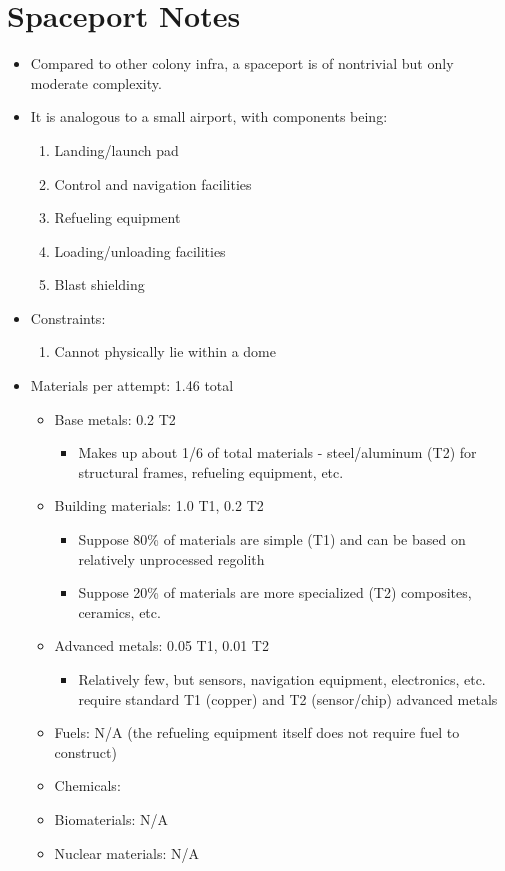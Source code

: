 \documentclass{article}
\begin{document}
\section*{Spaceport Notes}
\begin{itemize}
    \item Compared to other colony infra, a spaceport is of nontrivial but only moderate complexity.
    \item It is analogous to a small airport, with components being:
    \begin{enumerate}
        \item Landing/launch pad
        \item Control and navigation facilities
        \item Refueling equipment
        \item Loading/unloading facilities
        \item Blast shielding
    \end{enumerate}
    \item Constraints:
    \begin{enumerate}
        \item Cannot physically lie within a dome
    \end{enumerate}
    \item Materials per attempt: 1.46 total
    \begin{itemize}
        \item Base metals: 0.2 T2
        \begin{itemize}
            \item Makes up about 1/6 of total materials - steel/aluminum (T2) for structural frames, refueling
                equipment, etc.
        \end{itemize}
        \item Building materials: 1.0 T1, 0.2 T2
        \begin{itemize}
            \item Suppose 80\% of materials are simple (T1) and can be based on relatively unprocessed regolith
            \item Suppose 20\% of materials are more specialized (T2) composites, ceramics, etc.
        \end{itemize}
        \item Advanced metals: 0.05 T1, 0.01 T2
        \begin{itemize}
            \item Relatively few, but sensors, navigation equipment, electronics, etc. require standard T1 (copper) and T2 (sensor/chip) advanced metals
        \end{itemize}
        \item Fuels: N/A (the refueling equipment itself does not require fuel to construct)
        \item Chemicals:
        \item Biomaterials: N/A
        \item Nuclear materials: N/A
    \end{itemize}
\end{itemize}
\end{document}
